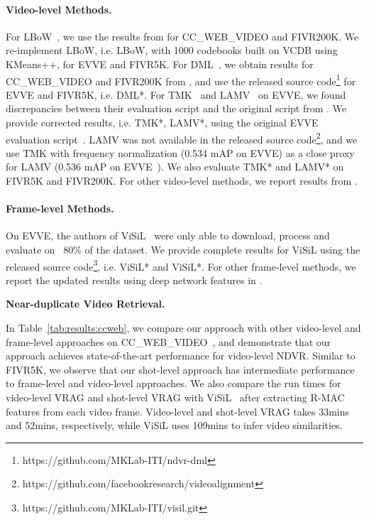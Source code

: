 \documentclass[letterpaper]{article} \usepackage{aaai22}  \usepackage{times}  \usepackage{helvet}  \usepackage{courier}  \usepackage[hyphens]{url}  \usepackage{graphicx} \urlstyle{rm} \usepackage{amsmath}
\begin{document}
\paragraph{Video-level Methods.} For LBoW~\cite{lbow}, we use the results from \cite{video-verification-fake-news} for CC\_WEB\_VIDEO and FIVR200K. We re-implement LBoW, i.e. LBoW, with 1000 codebooks built on  VCDB using KMeans++, for EVVE and FIVR5K. For DML~\cite{kordopatis2017dml}, we obtain results for CC\_WEB\_VIDEO and FIVR200K from \cite{video-verification-fake-news}, and use the released source code\footnote{https://github.com/MKLab-ITI/ndvr-dml} for EVVE and FIVR5K, i.e. DML*. 
For TMK~\cite{baseline:tmk} and LAMV~\cite{Baraldi2018LAMVLT} on EVVE, we found discrepancies between their evaluation script and the original script from \cite{dataset:evve}. We provide corrected results, i.e. TMK*, LAMV*, using the original EVVE evaluation script~\cite{dataset:evve}. LAMV was not available in the released source code\footnote{\label{footnote:lamv}https://github.com/facebookresearch/videoalignment}, and we use TMK with frequency normalization (0.534 mAP on EVVE) as a close proxy for LAMV (0.536 mAP on EVVE~\cite{Baraldi2018LAMVLT}). We also evaluate TMK* and LAMV* on FIVR5K and FIVR200K. For other video-level methods, we report results from \cite{kordopatiszilos2019visil}.

\vspace{-3mm}
\paragraph{Frame-level Methods.} On EVVE, the authors of ViSiL~\cite{kordopatiszilos2019visil} were only able to download, process and evaluate on ~80\% of the dataset. We provide complete results for ViSiL using the released source code\footnote{https://github.com/MKLab-ITI/visil.git}, i.e. ViSiL* and ViSiL*. For other frame-level methods, we report the updated results using deep network features in \cite{kordopatiszilos2019visil}.

\textbf{Near-duplicate Video Retrieval.}

In Table~\ref{tab:results:ccweb}, we compare our approach with other video-level and frame-level approaches on CC\_WEB\_VIDEO~\cite{dataset:cc-web-video}, and demonstrate that our approach achieves state-of-the-art performance for video-level NDVR. Similar to FIVR5K, we observe that our shot-level approach has intermediate performance to frame-level and video-level approaches. 
We also compare the run times for video-level VRAG and shot-level VRAG with ViSiL~\cite{kordopatiszilos2019visil} after extracting R-MAC features from each video frame. Video-level and shot-level VRAG takes 33mins and 52mins, respectively, while ViSiL uses 109mins to infer video similarities. 
\end{document}
